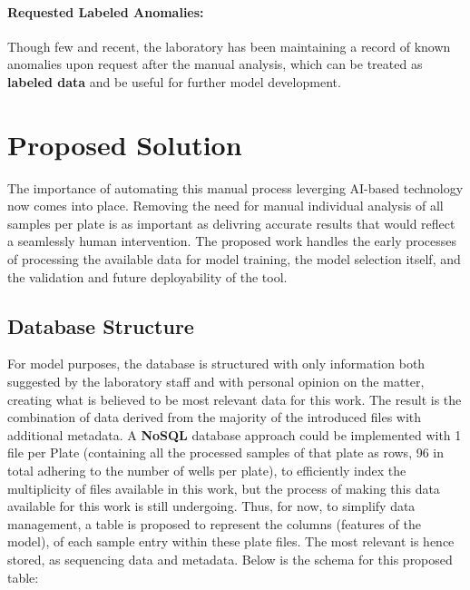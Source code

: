 \paragraph{Requested Labeled Anomalies:} Though few and recent, the laboratory has been maintaining a record of known anomalies upon request after the manual analysis, which can be treated as \textbf{labeled data} and be useful for further model development.

\section{Proposed Solution}
\label{sec:model}

The importance of automating this manual process leverging AI-based technology now comes into place. Removing the need for manual individual analysis of all samples per plate is as important as delivring accurate results that would reflect a seamlessly human intervention.
The proposed work handles the early processes of processing the available data for model training, the model selection itself, and the validation and future deployability of the tool.

\subsection{Database Structure}
For model purposes, the database is structured with only information both suggested by the laboratory staff and with personal opinion on the matter, creating what is believed to be most relevant data for this work. The result is the combination of data derived from the majority of the introduced files with additional metadata. A \textbf{NoSQL} database approach could be implemented with 1 file per Plate (containing all the processed samples of that plate as rows, 96 in total adhering to the number of wells per plate), to efficiently index the multiplicity of files available in this work, but the process of making this data available for this work is still undergoing. Thus, for now, to simplify data management, a table is proposed to represent the columns (features of the model), of each sample entry within these plate files. The most relevant is hence stored, as sequencing data and metadata. Below is the schema for this proposed table:

